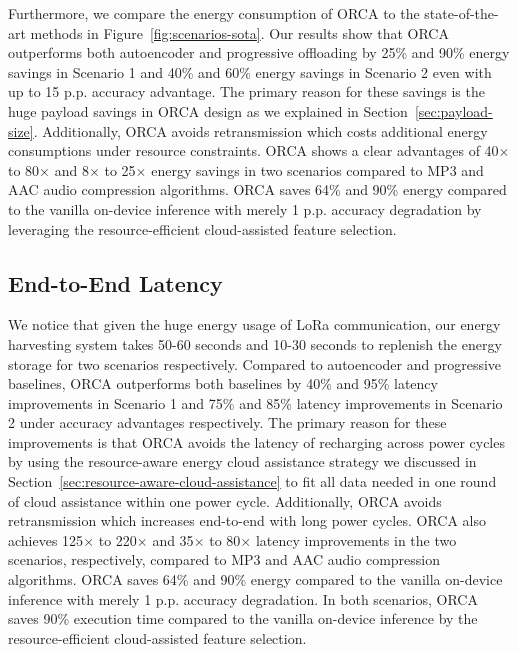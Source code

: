 Furthermore, we compare the energy consumption of ORCA to the state-of-the-art methods in Figure~\ref{fig:scenarios-sota}. Our results show that ORCA outperforms both autoencoder and progressive offloading by 25\% and 90\% energy savings in Scenario 1 and 40\% and 60\% energy savings in Scenario 2 even with up to 15 p.p. accuracy advantage. The primary reason for these savings is the huge payload savings in ORCA design as we explained in Section~\ref{sec:payload-size}. Additionally, ORCA avoids retransmission which costs additional energy consumptions under resource constraints. ORCA shows a clear advantages of 40$\times$ to 80$\times$ and 8$\times$ to 25$\times$ energy savings in two scenarios compared to MP3 and AAC audio compression algorithms. ORCA saves 64\% and 90\% energy compared to the vanilla on-device inference with merely 1 p.p. accuracy degradation by leveraging the resource-efficient cloud-assisted feature selection. 



\subsection{End-to-End Latency}
 We notice that given the huge energy usage of LoRa communication, our energy harvesting system takes 50-60 seconds and 10-30 seconds to replenish the energy storage for two scenarios respectively. Compared to autoencoder and progressive baselines, ORCA outperforms both baselines by 40\% and 95\% latency improvements in Scenario 1 and 75\% and 85\% latency improvements in Scenario 2 under accuracy advantages respectively. The primary reason for these improvements is that ORCA avoids the latency of recharging across power cycles by using the resource-aware energy cloud assistance strategy we discussed in Section~\ref{sec:resource-aware-cloud-assistance} to fit all data needed in one round of cloud assistance within one power cycle. Additionally, ORCA avoids retransmission which increases end-to-end with long power cycles. ORCA also achieves 125$\times$ to 220$\times$ and 35$\times$ to 80$\times$ latency improvements in the two scenarios, respectively, compared to MP3 and AAC audio compression algorithms. ORCA saves 64\% and 90\% energy compared to the vanilla on-device inference with merely 1 p.p. accuracy degradation. In both scenarios, ORCA saves 90\% execution time compared to the vanilla on-device inference by the resource-efficient cloud-assisted feature selection. 


